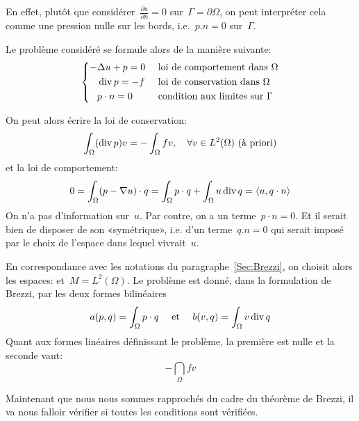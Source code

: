 En effet, plutôt que considérer~$\frac{\partial u}{\partial n}=0$ sur~$\Gamma=\partial\Omega$,
on peut interpréter cela comme une pression nulle sur les bords, i.e.~$p.n=0$ sur~$\Gamma$.

\medskip
Le problème considéré se formule alors de la manière suivante:
\begin{equation}\left\{
\begin{aligned}
-&\Delta u +p =0 && \text{ loi de comportement dans } \Omega\\
&\operatorname{div} p = -f && \text{ loi de conservation dans } \Omega\\
& p\cdot n=0 && \text{ condition aux limites sur }\Gamma
\end{aligned}
\right.
\end{equation}

On peut alors écrire la loi de conservation:
\begin{equation}
\displaystyle\int_\Omega (\operatorname{div} p) v = -\displaystyle\int_\Omega fv,\quad \forall v\in L^2(\Omega) \text{ (à priori)}
\end{equation}
et la loi de comportement:
\begin{equation}
0=\displaystyle\int_\Omega (p-\nabla u)\cdot q = \displaystyle\int_\Omega p\cdot q + \displaystyle\int_\Omega u \operatorname{div} q=\langle u,q\cdot n\rangle
\end{equation}
On n'a pas d'information sur~$u$.
Par contre, on a un terme~$p\cdot n=0$.
Et il serait bien de disposer de son «symétrique», i.e. d'un terme~$q.n=0$ qui serait imposé
par le choix de l'espace dans lequel vivrait~$u$.

\medskip
En correspondance avec les notations du paragraphe~\ref{Sec:Brezzi}, on choisit alors les espaces:
et~$M=L^2(\Omega)$.
Le problème est donné, dans la formulation de Brezzi,
par les deux formes bilinéaires
\begin{equation}a(p,q)=\displaystyle\int_\Omega p\cdot q\quad\text{ et }\quad b(v,q)=\displaystyle\int_\Omega v\operatorname{div} q\end{equation}
Quant aux formes linéaires définissant le problème, la première est nulle et la
seconde vaut:\begin{equation}-\dint_\Omega fv\end{equation}

\medskip
Maintenant que nous nous sommes rapprochés du cadre du théorème de Brezzi,
il va nous falloir vérifier si toutes les conditions sont vérifiées.

